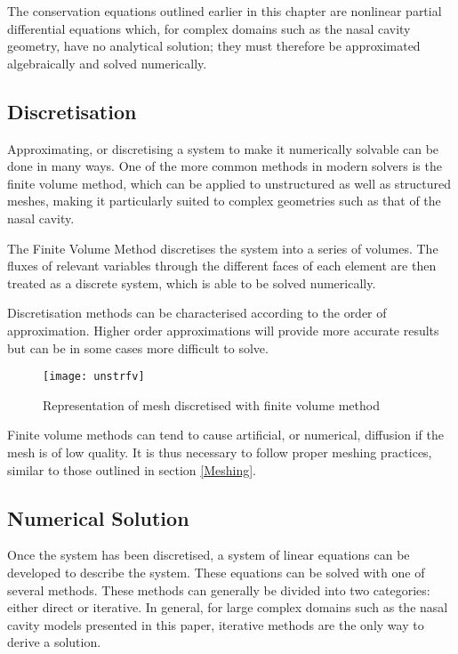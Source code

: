 The conservation equations outlined earlier in this chapter are nonlinear partial differential equations which, for complex domains such as the nasal cavity geometry, have no analytical solution; they must therefore be approximated algebraically and solved numerically.

\subsection{Discretisation}

Approximating, or discretising a system to make it numerically solvable can be done in many ways. One of the more common methods in modern solvers is the finite volume method, which can be applied to unstructured as well as structured meshes, making it particularly suited to complex geometries such as that of the nasal cavity.

The Finite Volume Method discretises the system into a series of volumes. The fluxes of relevant variables through the different faces of each element are then treated as a discrete system, which is able to be solved numerically.

Discretisation methods can be characterised according to the order of approximation. Higher order approximations will provide more accurate results but can be in some cases more difficult to solve.

\begin{figure}
  \texttt{[image: unstrfv]}
  \caption{Representation of mesh discretised with finite volume method}
  \label{usfv}
\end{figure}

Finite volume methods can tend to cause artificial, or numerical, diffusion if the mesh is of low quality. It is thus necessary to follow proper meshing practices, similar to those outlined in section \ref{Meshing}.

\subsection{Numerical Solution}

Once the system has been discretised, a system of linear equations can be developed to describe the system. These equations can be solved with one of several methods. These methods can generally be divided into two categories: either direct or iterative. In general, for large complex domains such as the nasal cavity models presented in this paper, iterative methods are the only way to derive a solution.

